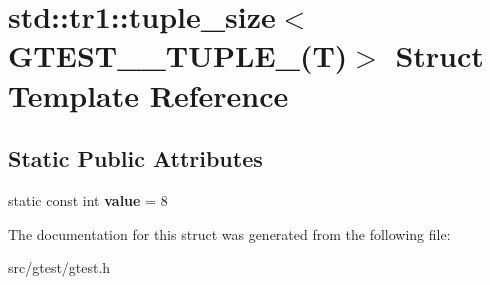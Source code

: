 \hypertarget{structstd_1_1tr1_1_1tuple__size_3_01_g_t_e_s_t__8___t_u_p_l_e___07_t_08_4}{}\section{std\+:\+:tr1\+:\+:tuple\+\_\+size$<$ G\+T\+E\+S\+T\+\_\+\_\+\+T\+U\+P\+L\+E\+\_\+(T)$>$ Struct Template Reference}
\label{structstd_1_1tr1_1_1tuple__size_3_01_g_t_e_s_t__8___t_u_p_l_e___07_t_08_4}
\subsection*{Static Public Attributes}
\begin{DoxyCompactItemize}
\item 
\mbox{\label{structstd_1_1tr1_1_1tuple__size_3_01_g_t_e_s_t__8___t_u_p_l_e___07_t_08_4_a9aa0c1933b5ef1f28db2db650140c408}} 
static const int {\bfseries value} = 8
\end{DoxyCompactItemize}


The documentation for this struct was generated from the following file\+:\begin{DoxyCompactItemize}
\item 
src/gtest/gtest.\+h\end{DoxyCompactItemize}
